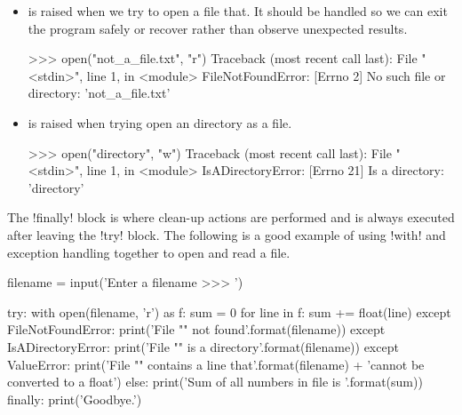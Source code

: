 \documentclass[11pt]{cselabheader}
\begin{document}
\begin{itemize}
  \item {} is raised when we try to open a file
  that. It should be handled so we can exit the program safely or recover
  rather than observe unexpected results.
  \begin{pyconcode}
>>> open("not_a_file.txt", "r")
Traceback (most recent call last):
  File "<stdin>", line 1, in <module>
FileNotFoundError: [Errno 2] No such file or directory: 'not_a_file.txt'
  \end{pyconcode}

  \item {} is raised when trying open an
  directory as a file.
  \begin{pyconcode}
>>> open("directory", "w")
Traceback (most recent call last):
  File "<stdin>", line 1, in <module>
IsADirectoryError: [Errno 21] Is a directory: 'directory'
  \end{pyconcode}
\end{itemize}

\pagebreak
The \pythoninline!finally! block is where clean-up actions are performed and is
always executed after leaving the \pythoninline!try! block.
The following is a good example of using \pythoninline!with! and exception
handling together to open and read a file.

\begin{python3code}
filename = input('Enter a filename >>> ')

try:
    with open(filename, 'r') as f:
        sum = 0
        for line in f:
            sum += float(line)
except FileNotFoundError:
    print('File "{}" not found'.format(filename))
except IsADirectoryError:
    print('File "{}" is a directory'.format(filename))
except ValueError:
    print('File "{}" contains a line that'.format(filename)
        + 'cannot be converted to a float')
else:
    print('Sum of all numbers in file is {}'.format(sum))
finally:
    print('Goodbye.')
\end{python3code}

\pagebreak
\end{document}
